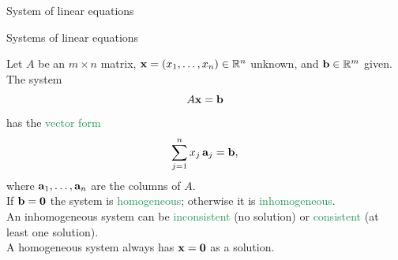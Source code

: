 \documentclass{beamer}
\begin{document}
\begin{frame} \begin{center}
	\alert{\Huge System of linear equations}
\end{center}\end{frame}


\begin{frame}{Systems of linear equations}
 
Let $A$ be an $m\times n$ matrix, ${\bf x}=(x_1,\ldots,x_n)\in\mathbb R^n$ unknown, and ${\bf b}\in\mathbb R^m$ given. The system
\[
A{\bf x}={\bf b}
\]
has the \textcolor{SeaGreen}{vector form}
\[
\sum_{j=1}^n x_j\,{\bf a}_j={\bf b},
\]
where ${\bf a}_1,\dots,{\bf a}_n$ are the columns of $A$.\\[6mm]

If ${\bf b}={\bf 0}$ the system is \textcolor{SeaGreen}{homogeneous}; otherwise it is \textcolor{SeaGreen}{inhomogeneous}.\\[3mm] 
An inhomogeneous system can be \textcolor{SeaGreen}{inconsistent} (no solution) or \textcolor{SeaGreen}{consistent} (at least one solution).\\[3mm]
 A homogeneous system always has ${\bf x}={\bf 0}$ as a solution.
 \end{frame}
\end{document}
